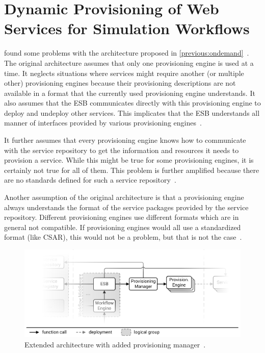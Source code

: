 \section{Dynamic Provisioning of Web Services for Simulation Workflows}
\label{previous:dynamic}

\citeauthor*{provisioning:dynamic} found some problems with the architecture proposed in \autoref{previous:ondemand}~\autocite{provisioning:dynamic}.
The original architecture assumes that only one provisioning engine is used at a time.
It neglects situations where services might require another (or multiple other) provisioning engines because their provisioning descriptions are not available in a format that the currently used provisioning engine understands.
It also assumes that the ESB communicates directly with this provisioning engine to deploy and undeploy other services.
This implicates that the ESB understands all manner of interfaces provided by various provisioning engines~\autocite{provisioning:dynamic}.

It further assumes that every provisioning engine knows how to communicate with the service repository to get the information and resources it needs to provision a service.
While this might be true for some provisioning engines, it is certainly not true for all of them.
This problem is further amplified because there are no standards defined for such a service repository~\autocite{provisioning:dynamic}.

Another assumption of the original architecture is that a provisioning engine always understands the format of the service packages provided by the service repository.
Different provisioning engines use different formats which are in general not compatible.
If provisioning engines would all use a standardized format (like CSAR), this would not be a problem, but that is not the case~\autocite{provisioning:dynamic}.

\begin{figure}[!htbp]
	\centering
	\includegraphics[resolution=600]{previous/assets/valeri_architecture}
	\caption{Extended architecture with added provisioning manager~\autocite[based on][]{serviceselection}.}
	\label{image:valeri_architecture}
\end{figure}

